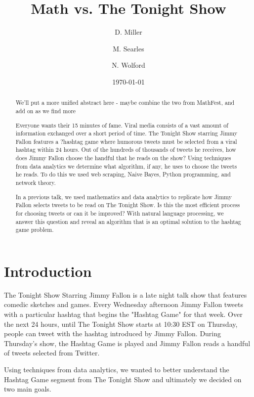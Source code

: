 \documentclass[titlepage]{article}
\begin{document}
\title{Math vs. The Tonight Show}
\author{D. Miller \and M. Searles \and N. Wolford} %
\date{\today}
\maketitle

\begin{abstract}
We'll put a more unified abstract here - maybe combine the two from MathFest, and add on as we find more

Everyone wants their 15 minutes of fame. Viral media consists of a vast amount of information
exchanged over a short period of time. The Tonight Show starring Jimmy Fallon features a ?hashtag
game where humorous tweets must be selected from a viral hashtag within 24 hours. Out of
the hundreds of thousands of tweets he receives, how does Jimmy Fallon choose the handful that
he reads on the show? Using techniques from data analytics we determine what algorithm, if any,
he uses to choose the tweets he reads. To do this we used web scraping, Naive Bayes, Python
programming, and network theory.

In a previous talk, we used mathematics and data analytics to replicate how Jimmy Fallon selects
tweets to be read on The Tonight Show. Is this the most efficient process for choosing tweets or
can it be improved? With natural language processing, we answer this question and reveal an algorithm
that is an optimal solution to the hashtag game problem.


\end{abstract}

\section{Introduction}


The Tonight Show Starring Jimmy Fallon is a late night talk show that features comedic sketches and games. Every Wednesday afternoon Jimmy Fallon tweets with a particular hashtag that begins the "Hashtag Game" for that week. Over the next 24 hours, until The Tonight Show starts at 10:30 EST on Thursday, people can tweet with the hashtag introduced by Jimmy Fallon. During Thursday's show, the Hashtag Game is played and Jimmy Fallon reads a handful of tweets selected from Twitter. 

Using techniques from data analytics, we wanted to better understand the Hashtag Game segment from The Tonight Show and ultimately we decided on two main goals.
\end{document}

